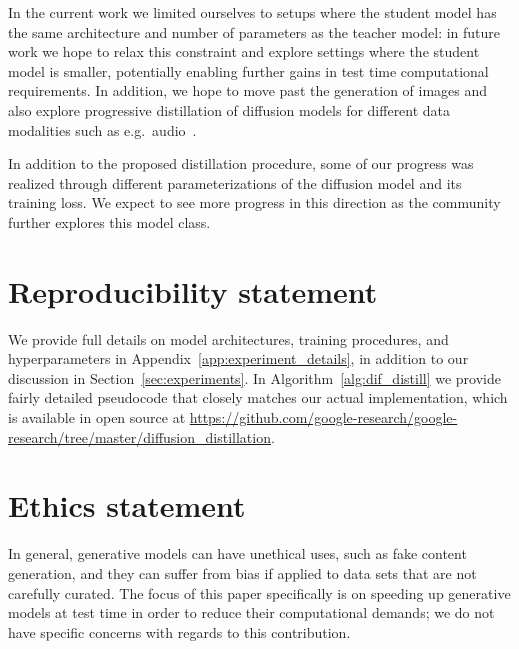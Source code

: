 \documentclass[hidelinks]{article} %
\begin{document}
In the current work we limited ourselves to setups where the student model has the same architecture and number of parameters as the teacher model: in future work we hope to relax this constraint and explore settings where the student model is smaller, potentially enabling further gains in test time computational requirements. In addition, we hope to move past the generation of images and also explore progressive distillation of diffusion models for different data modalities such as e.g.\ audio~\citep{chen2020wavegrad}.

In addition to the proposed distillation procedure, some of our progress was realized through different parameterizations of the diffusion model and its training loss. We expect to see more progress in this direction as the community further explores this model class.

\section*{Reproducibility statement}
We provide full details on model architectures, training procedures, and hyperparameters in Appendix~\ref{app:experiment_details}, in addition to our discussion in Section~\ref{sec:experiments}. In Algorithm~\ref{alg:dif_distill} we provide fairly detailed pseudocode that closely matches our actual implementation, which is available in open source at {\small \url{https://github.com/google-research/google-research/tree/master/diffusion_distillation}}.

\section*{Ethics statement}
In general, generative models can have unethical uses, such as fake content generation, and they can suffer from bias if applied to data sets that are not carefully curated. The focus of this paper specifically is on speeding up generative models at test time in order to reduce their computational demands; we do not have specific concerns with regards to this contribution. 




\newpage
\appendix
\end{document}
